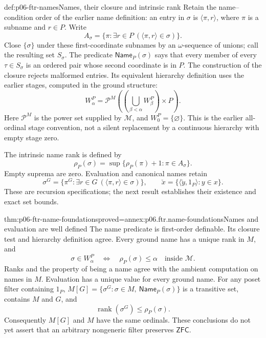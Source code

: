 \begin{hbdefinition}{def:p06-ftr-names}{Names, their closure and intrinsic rank}
Retain the name--condition order of the earlier name definition:
an entry in \(\sigma\) is \(\langle\pi,r\rangle\), where \(\pi\) is a
subname and \(r\in P\). Write
\[
 A_\sigma=\{\pi:\exists r\in P\ (\langle\pi,r\rangle\in\sigma)\}.
\]
Close \(\{\sigma\}\) under these first-coordinate subnames by an
\(\omega\)-sequence of unions; call the resulting set \(S_\sigma\).
The predicate \(\mathsf{Name}_P(\sigma)\) says that every member of every
\(\tau\in S_\sigma\) is an ordered pair whose second coordinate is in
\(P\). The construction of the closure rejects malformed entries.
Its equivalent hierarchy definition uses the earlier stages, computed in
the ground structure:
\[
 W_\alpha^P=
 \mathcal P^M\!\left(\left(\bigcup_{\beta<\alpha}W_\beta^P\right)\times P\right).
\]
Here \(\mathcal P^M\) is the power set supplied by \(\mathcal M\), and
\(W_0^P=\{\varnothing\}\). This is the earlier all-ordinal stage convention,
not a silent replacement by a continuous hierarchy with empty stage zero.

The intrinsic name rank is defined by
\[
 \rho_P(\sigma)=\sup\{\rho_P(\pi)+1:\pi\in A_\sigma\}.
\]
Empty suprema are zero. Evaluation and canonical names retain
\[
 \sigma^G=\{\pi^G:\exists r\in G\ (\langle\pi,r\rangle\in\sigma)\},
 \qquad \check x=\{\langle\check y,1_P\rangle:y\in x\}.
\]
These are recursion specifications; the next result establishes their
existence and exact set bounds.
\end{hbdefinition}

\begin{hbtheorem}{thm:p06-ftr-name-foundations}{proved=annex:p06.ftr.name-foundations}{Names and evaluation are well defined}
The name predicate is first-order definable. Its closure test and hierarchy
definition agree. Every ground name has a unique rank in \(M\), and
\[
 \sigma\in W_\alpha^P\quad\Longleftrightarrow\quad\rho_P(\sigma)\leq\alpha
 \quad\text{inside }\mathcal M.
\]
Ranks and the property of being a name agree with the ambient computation
on names in \(M\). Evaluation has a unique value for every ground name.
For any poset filter containing \(1_P\),
\(M[G]=\{\sigma^G:\sigma\in M,\ \mathsf{Name}_P(\sigma)\}\) is a
transitive set, contains \(M\) and \(G\), and
\[
 \operatorname{rank}(\sigma^G)\leq\rho_P(\sigma).
\]
Consequently \(M[G]\) and \(M\) have the same ordinals. These conclusions
do not yet assert that an arbitrary nongeneric filter preserves
\(\mathsf{ZFC}\).
\end{hbtheorem}


